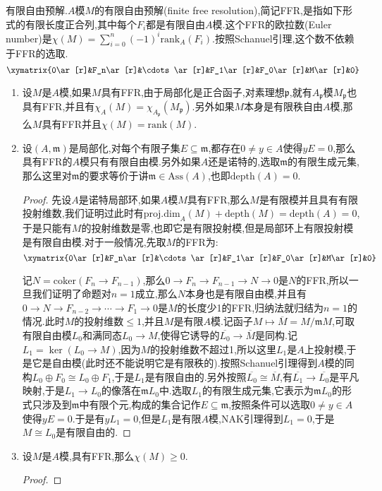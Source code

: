 有限自由预解.$A$模$M$的有限自由预解(finite free resolution),简记FFR,是指如下形式的有限长度正合列,其中每个$F_i$都是有限自由$A$模.这个FFR的欧拉数(Euler number)是$\chi(M)=\sum_{i=0}^n(-1)^i\mathrm{rank}_A(F_i)$.按照Schanuel引理,这个数不依赖于FFR的选取.
$$\xymatrix{0\ar[r]&F_n\ar[r]&\cdots\ar[r]&F_1\ar[r]&F_0\ar[r]&M\ar[r]&0}$$
\begin{enumerate}
	\item 设$M$是$A$模,如果$M$具有FFR,由于局部化是正合函子,对素理想$\mathfrak{p}$,就有$A_{\mathfrak{p}}$模$M_{\mathfrak{p}}$也具有FFR,并且有$\chi_A(M)=\chi_{A_{\mathfrak{p}}}(M_{\mathfrak{p}})$.另外如果$M$本身是有限秩自由$A$模,那么$M$具有FFR并且$\chi(M)=\mathrm{rank}(M)$.
	\item 设$(A,\mathfrak{m})$是局部化,对每个有限子集$E\subseteq\mathfrak{m}$,都存在$0\not=y\in A$使得$yE=0$,那么具有FFR的$A$模只有有限自由模.另外如果$A$还是诺特的,选取$\mathfrak{m}$的有限生成元集,那么这里对$\mathfrak{m}$的要求等价于讲$\mathfrak{m}\in\mathrm{Ass}(A)$,也即$\mathrm{depth}(A)=0$.
	\begin{proof}
		
		先设$A$是诺特局部环,如果$A$模$M$具有FFR,那么$M$是有限模并且具有有限投射维数,我们证明过此时有$\mathrm{proj.dim}_A(M)+\mathrm{depth}(M)=\mathrm{depth}(A)=0$,于是只能有$M$的投射维数是零,也即它是有限投射模,但是局部环上有限投射模是有限自由模.对于一般情况,先取$M$的FFR为:
		$$\xymatrix{0\ar[r]&F_n\ar[r]&\cdots\ar[r]&F_1\ar[r]&F_0\ar[r]&M\ar[r]&0}$$
		
		记$N=\mathrm{coker}(F_n\to F_{n-1})$,那么$0\to F_n\to F_{n-1}\to N\to0$是$N$的FFR,所以一旦我们证明了命题对$n=1$成立,那么$N$本身也是有限自由模,并且有$0\to N\to F_{n-2}\to\cdots\to F_1\to0$是$M$的长度少1的FFR,归纳法就归结为$n=1$的情况.此时$M$的投射维数$\le1$,并且$M$是有限$A$模.记函子$M\mapsto\overline{M}=M/\mathfrak{m}M$,可取有限自由模$L_0$和满同态$L_0\to M$,使得它诱导的$\overline{L_0}\to\overline{M}$是同构.记$L_1=\ker(L_0\to M)$,因为$M$的投射维数不超过1,所以这里$L_1$是$A$上投射模,于是它是自由模(此时还不能说明它是有限秩的).按照Schanuel引理得到$A$模的同构$L_0\oplus F_0\cong L_0\oplus F_1$,于是$L_1$是有限自由的.另外按照$\overline{L_0}\cong\overline{M}$,有$\overline{L_1}\to\overline{L_0}$是平凡映射,于是$L_1\to L_0$的像落在$\mathfrak{m}L_0$中.选取$L_1$的有限生成元集,它表示为$\mathfrak{m}L_0$的形式只涉及到$\mathfrak{m}$中有限个元,构成的集合记作$E\subseteq\mathfrak{m}$,按照条件可以选取$0\not=y\in A$使得$yE=0$.于是有$yL_1=0$,但是$L_1$是有限$A$模,NAK引理得到$L_1=0$,于是$M\cong L_0$是有限自由的.
	\end{proof}
    \item 设$M$是$A$模,具有FFR,那么$\chi(M)\ge0$.
    \begin{proof}
    	

\end{proof}
\end{enumerate}

